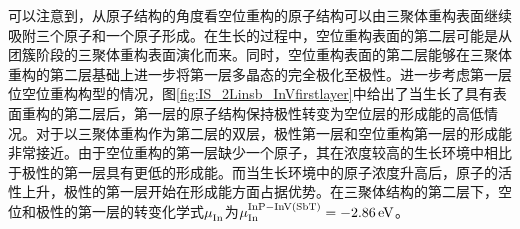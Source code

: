 可以注意到，从原子结构的角度看空位重构的原子结构可以由三聚体重构表面继续吸附三个原子和一个原子形成。在生长的过程中，空位重构表面的第二层可能是从团簇阶段的三聚体重构表面演化而来。同时，空位重构表面的第二层能够在三聚体重构的第二层基础上进一步将第一层多晶态的完全极化至极性。进一步考虑第一层位空位重构构型的情况，图\ref{fig:IS_2Linsb_InVfirstlayer}中给出了当生长了具有表面重构的第二层后，第一层的原子结构保持极性转变为空位层的形成能的高低情况。对于以三聚体重构作为第二层的双层，极性第一层和空位重构第一层的形成能非常接近。由于空位重构的第一层缺少一个原子，其在浓度较高的生长环境中相比于极性的第一层具有更低的形成能。而当生长环境中的原子浓度升高后，原子的活性上升，极性的第一层开始在形成能方面占据优势。在三聚体结构的第二层下，空位和极性的第一层的转变化学式$\it \mu_{\rm In}^{\rm } \it$为$\it \mu_{\rm In}^{\rm InP-InV\left(SbT\right)} \it=\SI{-2.86}{\electronvolt}$。

